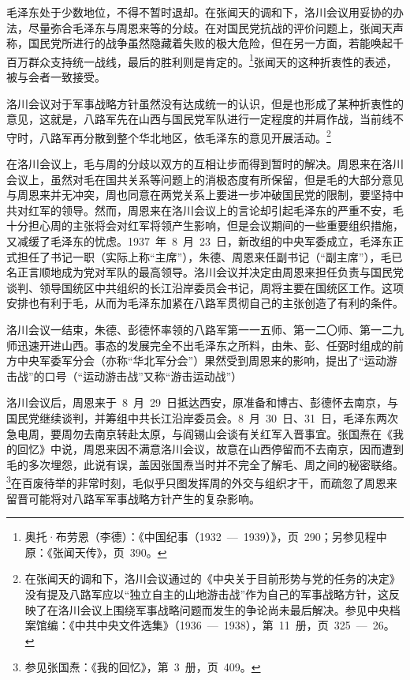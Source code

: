 毛泽东处于少数地位，不得不暂时退却。在张闻天的调和下，洛川会议用妥协的办法，尽量弥合毛泽东与周恩来等的分歧。在对国民党抗战的评价问题上，张闻天声称，国民党所进行的战争虽然隐藏着失败的极大危险，但在另一方面，若能唤起千百万群众支持统一战线，最后的胜利则是肯定的。\footnote{奥托·布劳恩（李德）：《中国纪事（1932~—~1939）》，页~290；另参见程中原：《张闻天传》，页~390。}张闻天的这种折衷性的表述，被与会者一致接受。

洛川会议对于军事战略方针虽然没有达成统一的认识，但是也形成了某种折衷性的意见，这就是，八路军先在山西与国民党军队进行一定程度的并肩作战，当前线不守时，八路军再分散到整个华北地区，依毛泽东的意见开展活动。\footnote{在张闻天的调和下，洛川会议通过的《中央关于目前形势与党的任务的决定》没有提及八路军应以“独立自主的山地游击战”作为自己的军事战略方针，这反映了在洛川会议上围绕军事战略问题而发生的争论尚未最后解决。参见中央档案馆编：《中共中央文件选集》（1936~—~1938），第~11~册，页~325~—~26。}

在洛川会议上，毛与周的分歧以双方的互相让步而得到暂时的解决。周恩来在洛川会议上，虽然对毛在国共关系等问题上的消极态度有所保留，但是毛的大部分意见与周恩来并无冲突，周也同意在两党关系上要进一步冲破国民党的限制，要坚持中共对红军的领导。然而，周恩来在洛川会议上的言论却引起毛泽东的严重不安，毛十分担心周的主张将会对红军将领产生影响，但是会议期间的一些重要组织措施，又减缓了毛泽东的忧虑。1937~年~8~月~23~日，新改组的中央军委成立，毛泽东正式担任了书记一职（实际上称“主席”），朱德、周恩来任副书记（“副主席”），毛已名正言顺地成为党对军队的最高领导。洛川会议并决定由周恩来担任负责与国民党谈判、领导国统区中共组织的长江沿岸委员会书记，周将主要在国统区工作。这项安排也有利于毛，从而为毛泽东加紧在八路军贯彻自己的主张创造了有利的条件。

洛川会议一结束，朱德、彭德怀率领的八路军第一一五师、第一二〇师、第一二九师迅速开进山西。事态的发展完全不出毛泽东之所料，由朱、彭、任弼时组成的前方中央军委军分会（亦称“华北军分会”）果然受到周恩来的影响，提出了“运动游击战”的口号（“运动游击战”又称“游击运动战”）

洛川会议后，周恩来于~8~月~29~日抵达西安，原准备和博古、彭德怀去南京，与国民党继续谈判，并筹组中共长江沿岸委员会。8~月~30~日、31~日，毛泽东两次急电周，要周勿去南京转赴太原，与阎锡山会谈有关红军入晋事宜。张国焘在《我的回忆》中说，周恩来因不满意洛川会议，故意在山西停留而不去南京，因而遭到毛的多次埋怨，此说有误，盖因张国焘当时并不完全了解毛、周之间的秘密联络。\footnote{参见张国焘：《我的回忆》，第~3~册，页~409。}在百废待举的非常时刻，毛似乎只图发挥周的外交与组织才干，而疏忽了周恩来留晋可能将对八路军军事战略方针产生的复杂影响。

